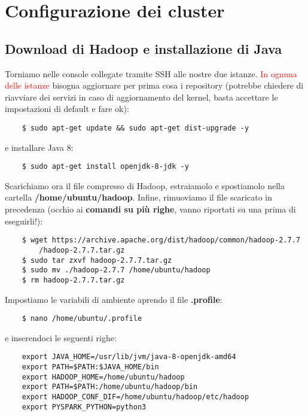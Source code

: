 \section{Configurazione dei cluster}


\subsection{Download di Hadoop e installazione di Java}

Torniamo nelle console collegate tramite SSH alle nostre due istanze. \textcolor{red}{In ognuna delle istanze} bisogna aggiornare per prima cosa i repository (potrebbe chiedere di riavviare dei servizi in caso di aggiornamento del kernel, basta accettare le impostazioni di default e fare ok):

\begin{verbatim}
    $ sudo apt-get update && sudo apt-get dist-upgrade -y
\end{verbatim}

e installare Java 8:

\begin{verbatim}
    $ sudo apt-get install openjdk-8-jdk -y
\end{verbatim}

Scarichiamo ora il file compresso di Hadoop, estraiamolo e spostiamolo nella cartella \textbf{/home/ubuntu/hadoop}. Infine, rimuoviamo il file scaricato in precedenza (occhio ai \textbf{comandi su più righe}, vanno riportati su una prima di eseguirli!):

\begin{verbatim}
    $ wget https://archive.apache.org/dist/hadoop/common/hadoop-2.7.7
        /hadoop-2.7.7.tar.gz
    $ sudo tar zxvf hadoop-2.7.7.tar.gz
    $ sudo mv ./hadoop-2.7.7 /home/ubuntu/hadoop
    $ rm hadoop-2.7.7.tar.gz
\end{verbatim}

Impostiamo le variabili di ambiente aprendo il file \textbf{.profile}:

\begin{verbatim}
    $ nano /home/ubuntu/.profile
\end{verbatim}

e inserendoci le seguenti righe:

\begin{verbatim}
    export JAVA_HOME=/usr/lib/jvm/java-8-openjdk-amd64
    export PATH=$PATH:$JAVA_HOME/bin
    export HADOOP_HOME=/home/ubuntu/hadoop
    export PATH=$PATH:/home/ubuntu/hadoop/bin
    export HADOOP_CONF_DIF=/home/ubuntu/hadoop/etc/hadoop
    export PYSPARK_PYTHON=python3
\end{verbatim}

